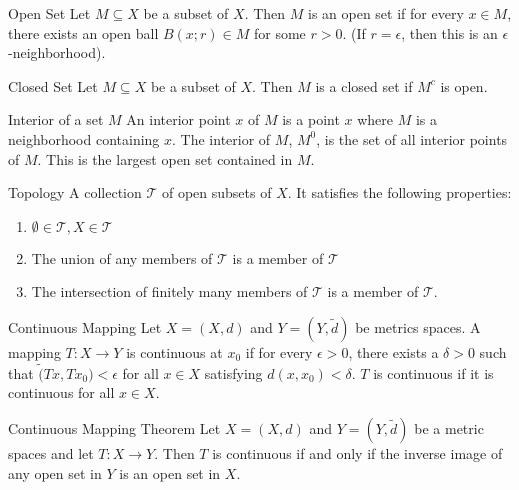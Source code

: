 \documentclass[avery5388,grid,frame]{flashcards}
\begin{document}
\begin{flashcard}[Definition]{Open Set}
Let $M\subseteq X$ be a subset of $X$. Then $M$ is an open set if for every $x\in M$, there exists an open ball $B(x;r)\in M$ for some $r>0$. (If $r=\epsilon$, then this is an $\epsilon$-neighborhood).
\end{flashcard}

\begin{flashcard}[Definition]{Closed Set}
Let $M\subseteq X$ be a subset of $X$. Then $M$ is a closed set if $M^c$ is open.
\end{flashcard}

\begin{flashcard}[Definition]{Interior of a set $M$}
An interior point $x$ of $M$ is a point $x$ where $M$ is a neighborhood containing $x$. The interior of $M$, $M^0$, is the set of all interior points of $M$. This is the largest open set contained in $M$.
\end{flashcard}

\begin{flashcard}[Definition]{Topology}
A collection $\mathscr{T}$ of open subsets of $X$. It satisfies the following properties:
\begin{enumerate}
\item $\emptyset\in\mathscr{T},X\in\mathscr{T}$\\
\item The union of any members of $\mathscr{T}$ is a member of $\mathscr{T}$
\item The intersection of finitely many members of $\mathscr{T}$ is a member of $\mathscr{T}$. 
\end{enumerate}
\end{flashcard}

\begin{flashcard}[Definition]{Continuous Mapping}
Let $X=(X,d)$ and $Y=(Y,\widetilde{d})$ be metrics spaces. A mapping $T\colon X\rightarrow Y$ is continuous at $x_0$ if for every $\epsilon>0$, there exists a $\delta>0$ such that  $\widetilde(Tx,Tx_0)<\epsilon$ for all $x\in X$ satisfying $d(x,x_0)<\delta$.
$T$ is continuous if it is continuous for all $x\in X$.
\end{flashcard}

\begin{flashcard}[Theorem]{Continuous Mapping Theorem}
Let $X=(X,d)$ and $Y=(Y,\widetilde{d})$ be a metric spaces and let $T\colon X\rightarrow Y$. Then $T$ is continuous if and only if the inverse image of any open set in $Y$ is an open set in $X$.
\end{flashcard}
\end{document}
